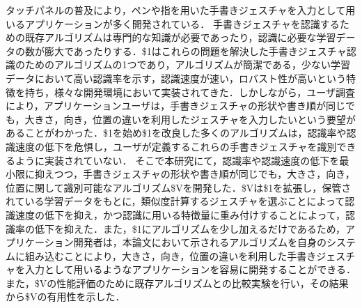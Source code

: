 タッチパネルの普及により，ペンや指を用いた手書きジェスチャを入力として用いるアプリケーションが多く開発されている．
手書きジェスチャを認識するための既存アルゴリズムは専門的な知識が必要であったり，認識に必要な学習データの数が膨大であったりする．\$1はこれらの問題を解決した手書きジェスチャ認識のためのアルゴリズムの1つであり，アルゴリズムが簡潔である，少ない学習データにおいて高い認識率を示す，認識速度が速い，ロバスト性が高いという特徴を持ち，様々な開発環境において実装されてきた．しかしながら，ユーザ調査により，アプリケーションユーザは，手書きジェスチャの形状や書き順が同じでも，大きさ，向き，位置の違いを利用したジェスチャを入力したいという要望があることがわかった．\$1を始め\$1を改良した多くのアルゴリズムは，認識率や認識速度の低下を危惧し，ユーザが定義するこれらの手書きジェスチャを識別できるように実装されていない．
そこで本研究にて，認識率や認識速度の低下を最小限に抑えつつ，手書きジェスチャの形状や書き順が同じでも，大きさ，向き，位置に関して識別可能なアルゴリズム\$Vを開発した．\$Vは\$1を拡張し，保管されている学習データをもとに，類似度計算するジェスチャを選ぶことによって認識速度の低下を抑え，かつ認識に用いる特徴量に重み付けすることによって，認識率の低下を抑えた．また，\$1にアルゴリズムを少し加えるだけであるため，アプリケーション開発者は，本論文において示されるアルゴリズムを自身のシステムに組み込むことにより，大きさ，向き，位置の違いを利用した手書きジェスチャを入力として用いるようなアプリケーションを容易に開発することができる．
また，\$Vの性能評価のために既存アルゴリズムとの比較実験を行い，その結果から\$Vの有用性を示した．
